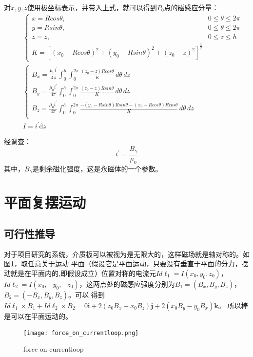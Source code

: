 \documentclass[AutoFakeBold]{LZUThesis}
\begin{document}
对$x, y, z$使用极坐标表示，并带入上式，就可以得到$P_{0}$点的磁感应分量：
\begin{equation}
    \begin{aligned}
        & \quad
        \left  \{
        \begin{array}{lr}
        x = Rcos\theta, & 0\leq \theta \leq 2\pi \\
        y = Rsin\theta, & 0\leq \theta \leq 2\pi \\
        z = z, & 0\leq z \leq h\\
        K = [(x_0 - Rcos\theta)^2 + (y_0 -Rsin\theta)^2 + (z_0 - z)^2]^\frac{3}{2}
        \end{array}
        \right.\\
        & \quad
        \left \{
        \begin{array}{lr}
        B_x = \frac{\mu_0i^{'}}{4\pi} \int_{0}^{h}\int_{0}^{2\pi} \frac{(z_0 - z)Rcos\theta}{K} \,d\theta\,dz & \\
        B_y = \frac{\mu_0i^{'}}{4\pi} \int_{0}^{h}\int_{0}^{2\pi} \frac{(z_0 - z)Rsin\theta}{K} \,d\theta\,dz & \\
        B_z = \frac{\mu_0i^{'}}{4\pi} \int_{0}^{h}\int_{0}^{2\pi} \frac{-(y_0 - Rsin\theta)Rsin\theta -(x_0 - Rcos\theta)Rcos\theta}{K} \,d\theta\,dz & \\
        \end{array}
        \right.\\
        & \quad
        I = i^{'}\text{d}z
    \end{aligned}
\end{equation}

经调查\cite{圆柱形永磁体磁场建模及仿真研究}：
\begin{equation}
    i^{'} = \frac{B_{\gamma}}{\mu_{0}}
\end{equation}
其中，$B_{\gamma}$是剩余磁化强度，这是永磁体的一个参数。

\section{平面复摆运动}
\subsection{可行性推导}
对于项目研究的系统，介质板可以被视为是无限大的，这样磁场就是轴对称的。如图\ref{force_on_currentloop}，取任意关于运动
平面（假设它是平面运动，只要没有垂直于平面的分力，摆动就是在平面内的,即假设成立）位置对称的电流元$Id\boldsymbol {\ell }_1 = I(x_0, y_0, z_0)$，
$Id\boldsymbol {\ell }_2 = I(x_0, -y_0, -z_0)$，这两点处的磁感应强度分别为$B_1 = (B_x, B_y, B_z)$，$B_2 = (-B_x, B_y, B_z)$。可以
得到$Id\boldsymbol {\ell }_1 \times B_1 + Id\boldsymbol {\ell }_2 \times B_2 = 0\mathbf{i} + 2(z_0B_x-x_0B_z)\mathbf{j} + 2(x_0B_y-y_0B_x)\mathbf{k}$。
所以棒是可以在平面运动的。
\begin{figure}[H]
    \centering
    \texttt{[image: force\_on\_currentloop.png]}
    \caption{force on currentloop}
    \label{force_on_currentloop}
\end{figure}
\end{document}
